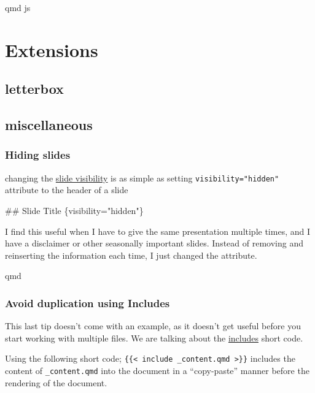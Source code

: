 \documentclass[
  letterpaper,
  DIV=11,
  numbers=noendperiod]{scrreprt}
\newenvironment{Shaded}{\begin{snugshade}}{\end{snugshade}}
\newcommand{\FunctionTok}[1]{\textcolor[rgb]{0.28,0.35,0.67}{#1}}
\begin{document}
qmd js

\part{Extensions}

\chapter{letterbox}\label{letterbox}


\chapter{miscellaneous}\label{miscellaneous}

\section{Hiding slides}\label{hiding-slides}

changing the
\href{https://quarto.org/docs/presentations/revealjs/advanced.html\#slide-visibility}{slide
visibility} is as simple as setting \texttt{visibility="hidden"}
attribute to the header of a slide

\begin{Shaded}
\begin{Highlighting}[]
\FunctionTok{\#\# Slide Title \{visibility="hidden"\}}
\end{Highlighting}
\end{Shaded}

I find this useful when I have to give the same presentation multiple
times, and I have a disclaimer or other seasonally important slides.
Instead of removing and reinserting the information each time, I just
changed the attribute.

qmd

\section{Avoid duplication using
Includes}\label{avoid-duplication-using-includes}

This last tip doesn't come with an example, as it doesn't get useful
before you start working with multiple files. We are talking about the
\href{https://quarto.org/docs/authoring/includes.html}{includes} short
code.

Using the following short code;
\texttt{\{\{\textless{}\ include\ \_content.qmd\ \textgreater{}\}\}}
includes the content of \texttt{\_content.qmd} into the document in a
``copy-paste'' manner before the rendering of the document.
\end{document}
